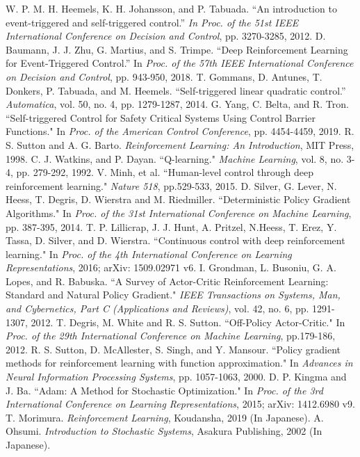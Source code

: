 \documentclass[english, dvipdfmx]{ampmt}             %
\begin{document}
\begin{thebibliography}{20}
W. P. M. H. Heemels, K. H. Johansson, and P. Tabuada. ``An introduction to event-triggered and self-triggered control.” \textit{In Proc. of the 51st IEEE International Conference on Decision and Control}, pp. 3270-3285, 2012.
D. Baumann, J. J. Zhu, G. Martius, and S. Trimpe. ``Deep Reinforcement Learning for Event-Triggered Control.”  In \textit{Proc. of the 57th IEEE International Conference on Decision and Control}, pp. 943-950, 2018.
T. Gommans, D. Antunes, T. Donkers, P. Tabuada, and M. Heemels. ``Self-triggered linear quadratic control.” \textit{Automatica}, vol. 50, no. 4, pp. 1279-1287, 2014.
G. Yang, C. Belta, and R. Tron. ``Self-triggered Control for Safety Critical Systems Using Control Barrier Functions."  In \textit{Proc. of the American Control Conference},  pp. 4454-4459, 2019.
R. S. Sutton and A. G. Barto. \textit{Reinforcement Learning: An Introduction}, MIT Press, 1998.
C. J. Watkins, and P. Dayan. ``Q-learning." \textit{Machine Learning}, vol. 8, no. 3-4, pp. 279-292, 1992.
V. Minh, et al. ``Human-level control through deep reinforcement learning." \textit{Nature 518}, pp.529-533, 2015.
D. Silver, G. Lever, N. Heess, T. Degris, D. Wierstra and M. Riedmiller. ``Deterministic Policy Gradient Algorithms." In \textit{Proc. of the 31st International Conference on Machine Learning}, pp. 387-395, 2014.
T. P. Lillicrap, J. J. Hunt, A. Pritzel, N.Heess, T. Erez, Y. Tassa, D. Silver, and D. Wierstra. ``Continuous control with deep reinforcement learning." In \textit{Proc. of the 4th International Conference on Learning Representations}, 2016; arXiv: 1509.02971 v6.
I. Grondman, L. Busoniu, G. A. Lopes, and R. Babuska. ``A Survey of Actor-Critic Reinforcement Learning: Standard and Natural Policy Gradient." \textit{IEEE Transactions on Systems, Man, and Cybernetics, Part C (Applications and Reviews)}, vol. 42, no. 6, pp. 1291-1307, 2012.
T. Degris, M. White and R. S. Sutton. ``Off-Policy Actor-Critic." In \textit{Proc. of the 29th International Conference on Machine Learning}, pp.179-186, 2012.
R. S. Sutton, D. McAllester, S. Singh, and Y. Mansour. ``Policy gradient methods for reinforcement learning with function approximation." In \textit{Advances in Neural Information Processing Systems}, pp. 1057-1063, 2000.
D. P. Kingma and J. Ba. ``Adam: A Method for Stochastic Optimization." In \textit{Proc. of the 3rd International Conference on Learning Representations}, 2015; arXiv: 1412.6980 v9.
T. Morimura. \textit{Reinforcement Learning}, Koudansha, 2019 (In Japanese).
A. Ohsumi. \textit{Introduction to Stochastic Systems}, Asakura Publishing, 2002 (In Japanese).

\end{thebibliography}
\end{document}
